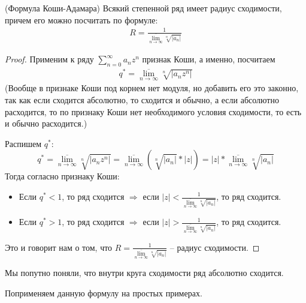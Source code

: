 \begin{theorem} (Формула Коши-Адамара)
    Всякий степенной ряд имеет радиус сходимости, причем его можно посчитать по формуле:
    \begin{gather*}
        R = \frac{1}{\overline{\lim\limits_{n \to \infty}} \sqrt[n]{|a_n|}}
    \end{gather*}
\end{theorem}
\begin{proof}
    Применим к ряду $\sum\limits_{n = 0}^\infty a_n z^n$ признак Коши, а именно, посчитаем 
    \begin{gather*}
        q^* = \overline{\lim\limits_{n \to \infty}} \sqrt[n]{|a_nz^n|}
    \end{gather*}
    (Вообще в признаке Коши под корнем нет модуля, но добавить его это законно, так как если сходится абсолютно, то сходится и обычно, а если абсолютно расходится, то по признаку Коши нет необходимого условия сходимости, то есть и обычно расходится.)

    Распишем $q^*:$ \[ q^* = \overline{\lim_{n \to \infty}} \sqrt[n]{|a_nz^n|} = \overline{\lim_{n \to \infty}} (\sqrt[n]{|a_n|} * |z|) = |z| * \overline{\lim_{n \to \infty}} \sqrt[n]{|a_n|}   \]
    Тогда согласно признаку Коши: \begin{itemize}
        \item Если $q^* < 1$, то ряд сходится $\Rightarrow$ если $|z| < \frac{1}{\overline{\lim\limits_{n \to \infty}} \sqrt[n]{|a_n|}}$, то ряд сходится.
        \item Если $q^* > 1$, то ряд сходится $\Rightarrow$ если $|z| > \frac{1}{\overline{\lim\limits_{n \to \infty}} \sqrt[n]{|a_n|}}$, то ряд сходится.
    \end{itemize}
    Это и говорит нам о том, что $R = \frac{1}{\overline{\lim\limits_{n \to \infty}} \sqrt[n]{|a_n|}}$ -- радиус сходимости.
\end{proof}

\begin{notice}
    Мы попутно поняли, что внутри круга сходимости ряд абсолютно сходится.
\end{notice}

\vspace*{7mm}
Поприменяем данную формулу на простых примерах.

